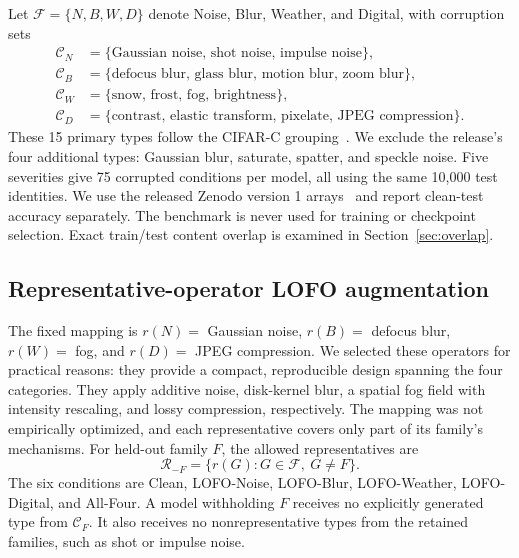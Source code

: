 \documentclass[twoside,a4paper,11pt]{article}
\begin{document}
Let $\mathcal{F}=\{N,B,W,D\}$ denote Noise, Blur, Weather, and Digital, with corruption sets
\begin{align*}
\mathcal{C}_{N}&=\{\text{Gaussian noise, shot noise, impulse noise}\},\\
\mathcal{C}_{B}&=\{\text{defocus blur, glass blur, motion blur, zoom blur}\},\\
\mathcal{C}_{W}&=\{\text{snow, frost, fog, brightness}\},\\
\mathcal{C}_{D}&=\{\text{contrast, elastic transform, pixelate, JPEG compression}\}.
\end{align*}
These 15 primary types follow the CIFAR-C grouping~\cite{hendrycks2019corruptions}. We exclude the release's four additional types: Gaussian blur, saturate, spatter, and speckle noise. Five severities give 75 corrupted conditions per model, all using the same 10,000 test identities. We use the released Zenodo version 1 arrays~\cite{hendrycks2019cifar100c} and report clean-test accuracy separately. The benchmark is never used for training or checkpoint selection. Exact train/test content overlap is examined in Section~\ref{sec:overlap}.

\subsection{Representative-operator LOFO augmentation}
\label{sec:augmentation}
The fixed mapping is $r(N)=$ Gaussian noise, $r(B)=$ defocus blur, $r(W)=$ fog, and $r(D)=$ JPEG compression. We selected these operators for practical reasons: they provide a compact, reproducible design spanning the four categories. They apply additive noise, disk-kernel blur, a spatial fog field with intensity rescaling, and lossy compression, respectively. The mapping was not empirically optimized, and each representative covers only part of its family's mechanisms. For held-out family $F$, the allowed representatives are
\begin{equation}
\mathcal{R}_{-F}=\{r(G):G\in\mathcal{F},\ G\ne F\}.
\end{equation}
The six conditions are Clean, LOFO-Noise, LOFO-Blur, LOFO-Weather, LOFO-Digital, and All-Four. A model withholding $F$ receives no explicitly generated type from $\mathcal{C}_F$. It also receives no nonrepresentative types from the retained families, such as shot or impulse noise.
\end{document}

